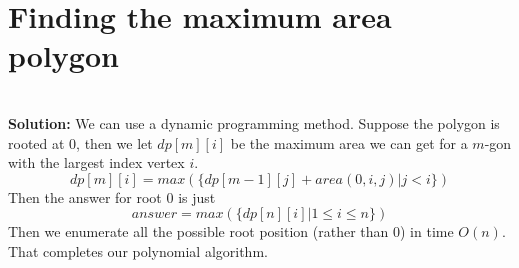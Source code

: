 

\section{Finding the maximum area polygon}

\ \\{\bf Solution:} We can use a dynamic programming method. Suppose the polygon is rooted at 0, then we let $dp[m][i]$ be the maximum area we can get for a $m$-gon with the largest index vertex $i$. 
\[
dp[m][i] = max(\{dp[m-1][j]+area(0, i, j)|j<i\})
\]
Then the answer for root 0 is just
\[
answer = max(\{dp[n][i] | 1\le i\le n\}) 
\]
Then we enumerate all the possible root position (rather than 0) in time $O(n)$. That completes our polynomial algorithm.